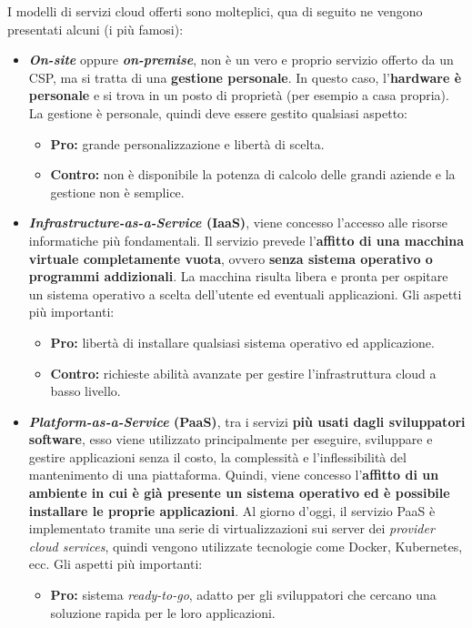 \documentclass[a4paper]{article}
\begin{document}
	I modelli di servizi cloud offerti sono molteplici, qua di seguito ne vengono presentati alcuni (i più famosi):
	\begin{itemize}
		\item \textcolor{Red3}{\textbf{\emph{On-site}}} oppure \textcolor{Red3}{\textbf{\emph{on-premise}}}, non è un vero e proprio servizio offerto da un CSP, ma si tratta di una \textbf{gestione personale}. In questo caso, l'\textbf{hardware è personale} e si trova in un posto di proprietà (per esempio a casa propria). La gestione è personale, quindi deve essere gestito qualsiasi aspetto:
		\begin{itemize}
			\item \textcolor{Green4}{\textbf{Pro:}} grande personalizzazione e libertà di scelta.
			\item \textcolor{Red4}{\textbf{Contro:}} non è disponibile la potenza di calcolo delle grandi aziende e la gestione non è semplice.
		\end{itemize}
		
		\item \textcolor{Red3}{\textbf{\emph{Infrastructure-as-a-Service} (IaaS)}}, viene concesso l'accesso alle risorse informatiche più fondamentali. Il servizio prevede l'\textbf{affitto di una macchina virtuale completamente vuota}, ovvero \textbf{senza sistema operativo o programmi addizionali}. La macchina risulta libera e pronta per ospitare un sistema operativo a scelta dell'utente ed eventuali applicazioni. Gli aspetti più importanti:
		\begin{itemize}
			\item \textcolor{Green4}{\textbf{Pro:}} libertà di installare qualsiasi sistema operativo ed applicazione.
			
			\item \textcolor{Red4}{\textbf{Contro:}} richieste abilità avanzate per gestire l'infrastruttura cloud a basso livello.
		\end{itemize}
		
		\item \textcolor{Red3}{\textbf{\emph{Platform-as-a-Service} (PaaS)}}, tra i servizi \textbf{più usati dagli sviluppatori software}, esso viene utilizzato principalmente per eseguire, sviluppare e gestire applicazioni senza il costo, la complessità e l'inflessibilità del mantenimento di una piattaforma. Quindi, viene concesso l'\textbf{affitto di un ambiente in cui è già presente un sistema operativo ed è possibile installare le proprie applicazioni}. Al giorno d'oggi, il servizio PaaS è implementato tramite una serie di virtualizzazioni sui server dei \emph{provider cloud services}, quindi vengono utilizzate tecnologie come Docker, Kubernetes, ecc. Gli aspetti più importanti:
		\begin{itemize}
			\item \textcolor{Green4}{\textbf{Pro:}} sistema \emph{ready-to-go}, adatto per gli sviluppatori che cercano una soluzione rapida per le loro applicazioni.
			

\end{itemize}
\end{itemize}
\end{document}
